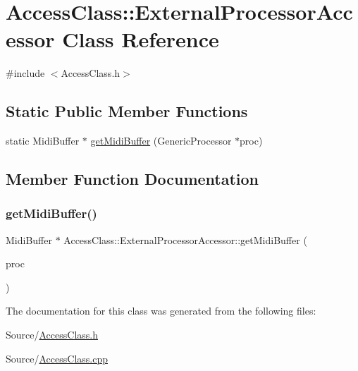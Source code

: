 \hypertarget{class_access_class_1_1_external_processor_accessor}{}\section{Access\+Class\+:\+:External\+Processor\+Accessor Class Reference}
\label{class_access_class_1_1_external_processor_accessor}


{\ttfamily \#include $<$Access\+Class.\+h$>$}

\subsection*{Static Public Member Functions}
\begin{DoxyCompactItemize}
\item 
static Midi\+Buffer $\ast$ \mbox{\hyperlink{class_access_class_1_1_external_processor_accessor_a698423b149b9ff58758920993efb0936}{get\+Midi\+Buffer}} (Generic\+Processor $\ast$proc)
\end{DoxyCompactItemize}


\subsection{Member Function Documentation}
\mbox{\label{class_access_class_1_1_external_processor_accessor_a698423b149b9ff58758920993efb0936}} 
\subsubsection{\texorpdfstring{get\+Midi\+Buffer()}{getMidiBuffer()}}
{\footnotesize\ttfamily Midi\+Buffer $\ast$ Access\+Class\+::\+External\+Processor\+Accessor\+::get\+Midi\+Buffer (\begin{DoxyParamCaption}\item[{Generic\+Processor $\ast$}]{proc }\end{DoxyParamCaption})\hspace{0.3cm}{\ttfamily [static]}}



The documentation for this class was generated from the following files\+:\begin{DoxyCompactItemize}
\item 
Source/\mbox{\hyperlink{_access_class_8h}{Access\+Class.\+h}}\item 
Source/\mbox{\hyperlink{_access_class_8cpp}{Access\+Class.\+cpp}}\end{DoxyCompactItemize}
